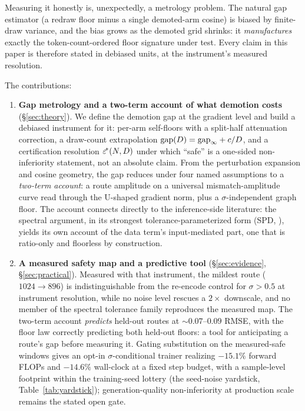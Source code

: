Measuring it honestly is, unexpectedly, a metrology problem. The
natural gap estimator (a redraw floor minus a single demoted-arm
cosine) is biased by finite-draw variance, and the bias grows as the
demoted grid shrinks: it \emph{manufactures} exactly the
token-count-ordered floor signature under test. Every claim in this
paper is therefore stated in debiased units, at the instrument's
measured resolution.

The contributions:

\begin{enumerate}
\item \textbf{Gap metrology and a two-term account of what demotion
costs} (\S\ref{sec:theory}). We define the
demotion gap at the gradient level and build a debiased instrument for
it: per-arm self-floors with a split-half attenuation correction, a
draw-count extrapolation $\mathrm{gap}(D) = \mathrm{gap}_\infty + c/D$, and a
certification resolution $\varepsilon^{\!*}(N, D)$ under which ``safe'' is a
one-sided non-inferiority statement, not an absolute claim. From the
perturbation expansion and cosine geometry, the gap reduces under four
named assumptions to a \emph{two-term account}: a route amplitude on a
universal mismatch-amplitude curve read through the U-shaped gradient
norm, plus a $\sigma$-independent graph floor. The account connects directly to
the inference-side literature: the spectral argument, in its strongest
tolerance-parameterized form (SPD, \citealp{xiao2026spd}), yields its
own account of the data term's input-mediated part, one that is
ratio-only and floorless by construction.
\item \textbf{A measured safety map and a predictive tool}
(\S\ref{sec:evidence}, \S\ref{sec:practical}). Measured with that
instrument, the mildest route ($1024{\to}896$) is indistinguishable
from the re-encode control for $\sigma > 0.5$ at instrument
resolution, while no noise level rescues a $2\times$ downscale, and
no member of the spectral tolerance family reproduces the measured
map. The two-term account \emph{predicts} held-out routes at
${\sim}0.07$--$0.09$ RMSE, with the floor law correctly predicting
both held-out floors: a tool for anticipating a route's gap before
measuring it. Gating substitution on the measured-safe windows gives an opt-in
$\sigma$-conditional trainer realizing $-15.1\%$ forward FLOPs and
$-14.6\%$ wall-clock at a fixed step budget, with a sample-level
footprint within the training-seed lottery (the seed-noise yardstick,
Table~\ref{tab:yardstick}); generation-quality non-inferiority at
production scale remains the stated open gate.
\end{enumerate}

